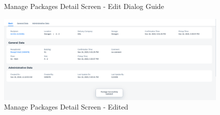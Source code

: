 \begin{figure}[htb!]
    \hspace{5pt}
    \caption{Manage Packages Detail Screen - Edit Dialog Guide}
	\label{fig:MPDetailEditBtn}
\end{figure}

\begin{figure}[H]
	\centering
	\includegraphics[width=1\linewidth]{images/user_doc/managePack/DetailScreen/edit/editToast.png}
	\caption{Manage Packages Detail Screen - Edited}
	\label{fig:MPReportEditDone}
\end{figure}

